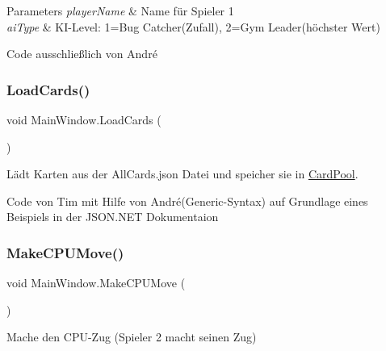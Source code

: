 \begin{DoxyParams}{Parameters}
{\em player\+Name} & Name für Spieler 1\\
\hline
{\em ai\+Type} & K\+I-\/\+Level\+: 1=Bug Catcher(\+Zufall), 2=Gym Leader(höchster Wert)\\
\hline
\end{DoxyParams}


Code ausschließlich von André\mbox{\label{class_main_window_ad9f0cc9d0eafd2f12bbe701c1183450e}} 
\subsubsection{\texorpdfstring{Load\+Cards()}{LoadCards()}}
{\footnotesize\ttfamily void Main\+Window.\+Load\+Cards (\begin{DoxyParamCaption}{ }\end{DoxyParamCaption})\hspace{0.3cm}{\ttfamily [inline]}}



Lädt Karten aus der All\+Cards.\+json Datei und speicher sie in \mbox{\hyperlink{class_main_window_ae1c30b48118e2c8c6cd16171fab0cd31}{Card\+Pool}}. 

Code von Tim mit Hilfe von André(Generic-\/\+Syntax) auf Grundlage eines Beispiels in der J\+S\+O\+N.\+N\+ET Dokumentaion\mbox{\label{class_main_window_a25b45e71a3e8fc76ab004cf4c9725c66}} 
\subsubsection{\texorpdfstring{Make\+C\+P\+U\+Move()}{MakeCPUMove()}}
{\footnotesize\ttfamily void Main\+Window.\+Make\+C\+P\+U\+Move (\begin{DoxyParamCaption}{ }\end{DoxyParamCaption})\hspace{0.3cm}{\ttfamily [inline]}}



Mache den C\+P\+U-\/\+Zug (Spieler 2 macht seinen Zug) 

\mbox{\label{class_main_window_a148f7bce0a5842ae629b21de2516e585}} 
